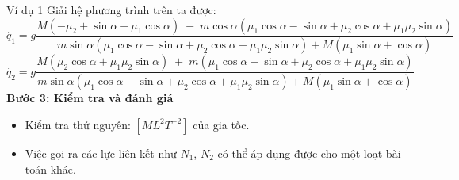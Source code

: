 \begin{frame}{Ví dụ 1}
    Giải hệ phương trình trên ta được:
    \begin{equation*}
    \ddot{q_1} = g\dfrac{M(-\mu_2+\sin\alpha-\mu_1\cos\alpha)\;-\;m\cos\alpha(\mu_1\cos\alpha-\sin\alpha+\mu_2\cos\alpha+\mu_1\mu_2\sin\alpha)}
{m\sin\alpha(\mu_1\cos\alpha-\sin\alpha+\mu_2\cos\alpha+\mu_1\mu_2\sin\alpha)+M(\mu_1\sin\alpha+\cos\alpha)}
    \end{equation*}
    \begin{equation*}
        \ddot{q_2} = g\dfrac{M(\mu_2\cos\alpha+\mu_1\mu_2\sin\alpha)\;+\;m(\mu_1\cos\alpha-\sin\alpha+\mu_2\cos\alpha+\mu_1\mu_2\sin\alpha)}
{m\sin\alpha(\mu_1\cos\alpha-\sin\alpha+\mu_2\cos\alpha+\mu_1\mu_2\sin\alpha)+M(\mu_1\sin\alpha+\cos\alpha)}
    \end{equation*}
\textbf{Bước 3: Kiểm tra và đánh giá}
\begin{itemize}
    \item Kiểm tra thứ nguyên: \([ML^2T^{-2}]\) của gia tốc.
    \item Việc gọi ra các lực liên kết như \(N_1\), \(N_2\) có thể áp dụng được cho một loạt bài toán khác.
\end{itemize}
\end{frame}